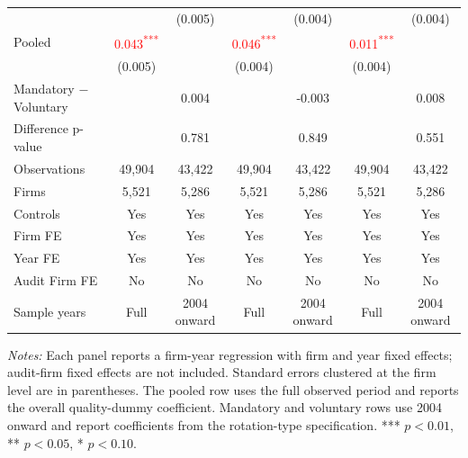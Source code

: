 \documentclass[10pt]{article}
\newcommand{\sym}[1]{\textsuperscript{#1}}
\begin{document}
\begin{minipage}{19cm}
\begin{threeparttable}
\begin{tabular}{l cc cc cc}
 &  & (0.005) &  & (0.004) &  & (0.004) \\
Pooled & \textcolor{red}{0.043\sym{***}} &  & \textcolor{red}{0.046\sym{***}} &  & \textcolor{red}{0.011\sym{***}} &  \\
 & (0.005) &  & (0.004) &  & (0.004) &  \\
Mandatory $-$ Voluntary &  & 0.004 &  & -0.003 &  & 0.008 \\
Difference p-value &  & 0.781 &  & 0.849 &  & 0.551 \\
Observations & 49,904 & 43,422 & 49,904 & 43,422 & 49,904 & 43,422 \\
Firms & 5,521 & 5,286 & 5,521 & 5,286 & 5,521 & 5,286 \\
\midrule
Controls & Yes & Yes & Yes & Yes & Yes & Yes \\
Firm FE & Yes & Yes & Yes & Yes & Yes & Yes \\
Year FE & Yes & Yes & Yes & Yes & Yes & Yes \\
Audit Firm FE & No & No & No & No & No & No \\
Sample years & Full & 2004 onward & Full & 2004 onward & Full & 2004 onward \\
\bottomrule
\end{tabular}
\begin{tablenotes}\fontsize{9}{11}\selectfont
\item \fontsize{9}{11}\selectfont \textit{Notes:} Each panel reports a firm-year regression with firm and year fixed effects; audit-firm fixed effects are not included. Standard errors clustered at the firm level are in parentheses. The pooled row uses the full observed period and reports the overall quality-dummy coefficient. Mandatory and voluntary rows use 2004 onward and report coefficients from the rotation-type specification. *** \(p<0.01\), ** \(p<0.05\), * \(p<0.10\).
\end{tablenotes}
\end{threeparttable}

\end{minipage}
\end{document}
